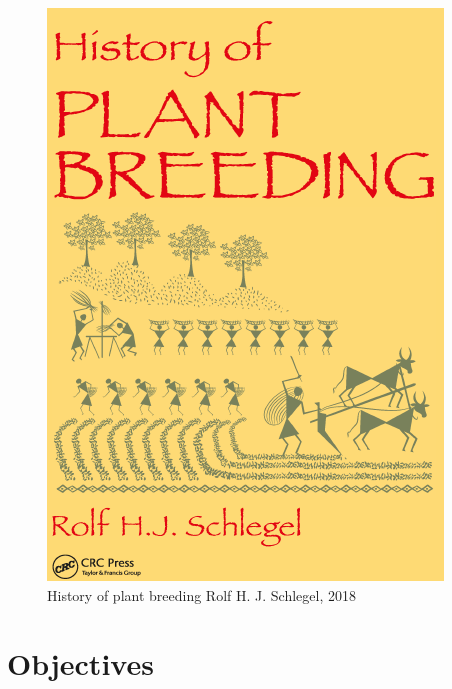\documentclass[11pt,ignorenonframetext,aspectratio=169]{beamer}
\begin{document}
\begin{frame}{}
\protect\hypertarget{section-13}{}
\begin{figure}
\includegraphics[width=0.4\linewidth,height=0.7\textwidth, keepaspectratio]{./images/plant_breeding_history} \caption{History of plant breeding Rolf H. J. Schlegel, 2018}\label{fig:plb-history-book}
\end{figure}
\end{frame}

\hypertarget{objectives}{%
\section{Objectives}\label{objectives}}
\end{document}
